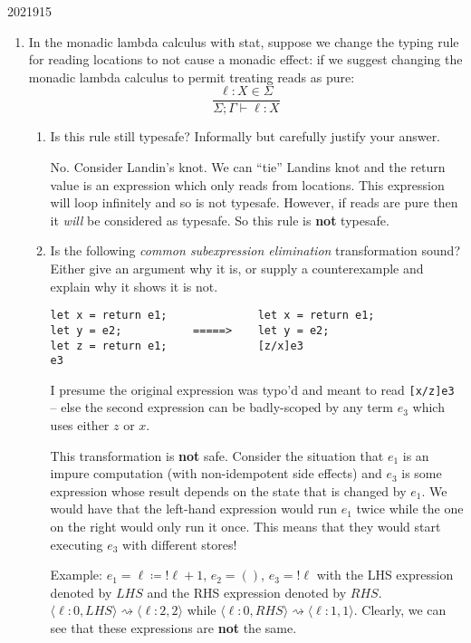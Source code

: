 \documentclass[10pt,\jkfside,a4paper]{article}
\newcommand{\abr}[2]{\ensuremath{\langle #1, #2 \rangle}}
\begin{document}
\begin{enumerate}
\begin{examquestion}{2021}{9}{15}
\begin{enumerate}[label=(\alph*)]
            \item In the monadic lambda calculus with stat, suppose we change the typing rule for reading locations to not cause a monadic effect: if we suggest changing the monadic lambda calculus to permit
            treating reads as pure:
            \[
                \dfrac{\ell: X \in \Sigma}{\Sigma; \Gamma \vdash \ell: X}
            \]
            \begin{enumerate}

                \item Is this rule still typesafe? Informally but carefully justify your answer.

                No. Consider Landin's knot. We can ``tie'' Landins knot and the return value is an expression which only reads from locations. This expression will loop infinitely and so is not typesafe.
                However, if reads are pure then it \textit{will} be considered as typesafe. So this rule is \textbf{not} typesafe.

                \item Is the following \textit{common subexpression elimination} transformation sound? Either give an argument why it is, or supply a counterexample and explain why it shows it is not.

                \begin{verbatim}
let x = return e1;              let x = return e1;
let y = e2;           =====>    let y = e2;
let z = return e1;              [z/x]e3
e3
                \end{verbatim}

                I presume the original expression was typo'd and meant to read \texttt{[x/z]e3} -- else the second expression can be badly-scoped by any term $e_3$ which uses either $z$ or $x$.

                This transformation is \textbf{not} safe. Consider the situation that $e_1$ is an impure computation (with non-idempotent side effects) and $e_3$ is some expression whose result depends on the
                state that is changed by $e_1$. We would have that the left-hand expression would run $e_1$ twice while the one on the right would only run it once. This means that they would start executing
                $e_3$ with different stores!

                Example: $e_1 = \ell \coloneqq !\ell + 1$, $e_2 = ()$, $e_3 = !\ell$ with the LHS expression denoted by $\mathit{LHS}$ and the RHS expression denoted by $\mathit{RHS}$.
                $\abr{\ell: 0}{\mathit{LHS}} \rightsquigarrow \abr{\ell: 2}{2}$ while $\abr{\ell: 0}{\mathit{RHS}} \rightsquigarrow \abr{\ell: 1}{1}$. Clearly, we can see that these expressions are
                \textbf{not} the same.


\end{enumerate}
\end{enumerate}
\end{examquestion}
\end{enumerate}
\end{document}
